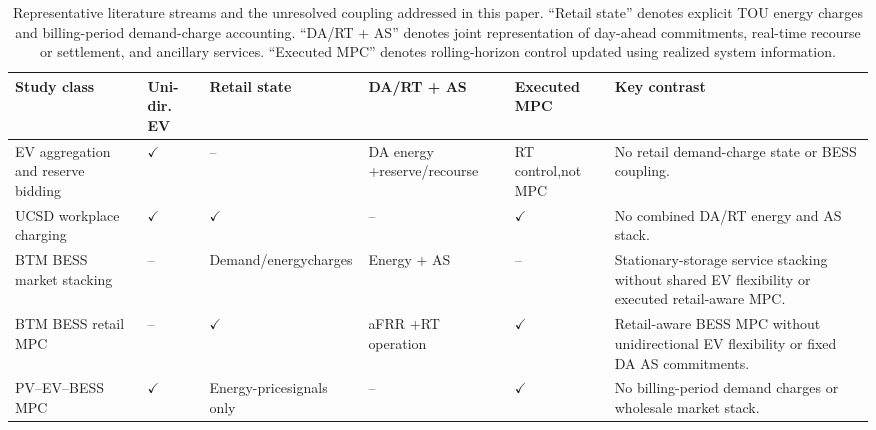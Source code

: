 \documentclass[final,5p,times]{elsarticle}
\begin{document}
\begin{table}[!t]
\centering
\caption{Representative literature streams and the unresolved coupling addressed in this paper.
``Retail state'' denotes explicit TOU energy charges and billing-period demand-charge accounting.
``DA/RT + AS'' denotes joint representation of day-ahead commitments, real-time recourse or settlement, and ancillary services.
``Executed MPC'' denotes rolling-horizon control updated using realized system information.}
\label{tab:literature_gap}
\scriptsize
\setlength{\tabcolsep}{3.0pt}

\begin{tabularx}{\textwidth}{
@{}
>{\raggedright\arraybackslash}p{}
>{\centering\arraybackslash}p{}
>{\centering\arraybackslash}p{}
>{\centering\arraybackslash}p{}
>{\centering\arraybackslash}p{}
>{\raggedright\arraybackslash}X
@{}}
\toprule

Study class
& Uni-dir. EV
& Retail state
& DA/RT + AS
& Executed MPC
& Key contrast \\

\midrule

EV aggregation and reserve bidding
\cite{vagropoulos2013optimal} \cite{bessa2014optimization}
&
$\checkmark$
&
--
&
DA energy +\newline reserve/recourse
&
RT control,\newline not MPC
&
No retail demand-charge state or BESS coupling. \\

UCSD workplace charging
\cite{chen2024costoptimal} \cite{chen2026realtime}
&
$\checkmark$
&
$\checkmark$
&
--
&
$\checkmark$
&
No combined DA/RT energy and AS stack. \\

BTM BESS market stacking
\cite{hanif2022multiservice} \cite{seward2022revenueStacking}
&
--
&
Demand/energy\newline charges
&
Energy + AS
&
--
&
Stationary-storage service stacking without shared EV flexibility or executed retail-aware MPC. \\

BTM BESS retail MPC
\cite{idomar2026stacked}
&
--
&
$\checkmark$
&
aFRR +\newline RT operation
&
$\checkmark$
&
Retail-aware BESS MPC without unidirectional EV flexibility or fixed DA AS commitments. \\

PV--EV--BESS MPC
\cite{cabrera2022realtime} \cite{cabrera2024robust}
&
$\checkmark$
&
Energy-price\newline signals only
&
--
&
$\checkmark$
&
No billing-period demand charges or wholesale market stack. \\


\end{tabularx}
\end{table}
\end{document}
